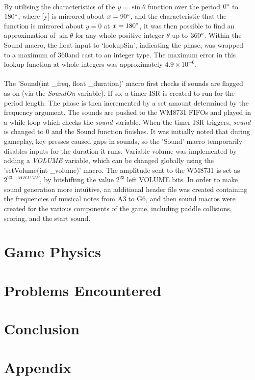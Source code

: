 \documentclass[a4paper,12pt]{article}
\begin{document}
\begin{flushleft}
\- \\
By utilising the characteristics of the $y=\sin\theta$ function over the period $0\degree$ to $180\degree$, where [y] is mirrored about $x=90\degree$, and the characteristic that the function is mirrored about $y=0$ at $x=180\degree$, it was then possible to find an approximation of $\sin\theta$ for any whole positive integer $\theta$ up to $360\degree$. Within the Sound macro, the float input to ‘lookupSin’, indicating the phase, was wrapped to a maximum of 360\degree and cast to an integer type. The maximum error in this lookup function at whole integers was approximately $4.9\times10^{-6}$.
\\ \- \\
The 'Sound(int \_freq, float \_duration)' macro first checks if sounds are flagged as on (via the \textit{SoundOn} variable). If so, a timer ISR is created to run for the period length. The phase is then incremented by a set amount determined by the frequency argument. The sounds are pushed to the WM8731 FIFOs and played in a while loop which checks the \textit{sound} variable. When the timer ISR triggers, \textit{sound} is changed to 0 and the Sound function finishes. It was initially noted that during gameplay, key presses caused gaps in sounds, so the 'Sound' macro temporarily disables inputs for the duration it runs.
Variable volume was implemented by adding a \textit{VOLUME} variable, which can be changed globally using the 'setVolume(int \_volume)' macro. The amplitude sent to the WM8731 is set as $2^{23+VOLUME}$, by bitshifting the value $2^{23}$ left VOLUME bits.
In order to make sound generation more intuitive, an additional header file was created containing the frequencies of musical notes from A3 to G6, and then sound macros were created for the various components of the game, including paddle collisions, scoring, and the start sound.
\end{flushleft}

\newpage
\section{Game Physics}
\newpage
\section{Problems Encountered}
\newpage
\section{Conclusion}
\begin{flushleft}

\end{flushleft}
\newpage
\section{Appendix \label{section:appendix}}
\newpage
{}
\begin{flushleft}

\end{flushleft}
\end{document}
